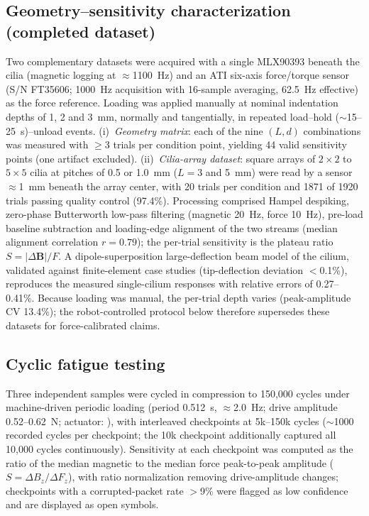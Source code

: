 \subsection*{Geometry--sensitivity characterization (completed dataset)}
Two complementary datasets were acquired with a single MLX90393 beneath the
cilia (magnetic logging at $\approx$1100~Hz) and an ATI six-axis force/torque
sensor (S/N FT35606; 1000~Hz acquisition with 16-sample averaging, 62.5~Hz
effective) as the force reference. Loading was applied manually at nominal
indentation depths of 1, 2 and 3~mm, normally and tangentially, in repeated
load--hold ($\sim$15--25~s)--unload events. (i)~\emph{Geometry matrix}: each
of the nine $(L,d)$ combinations was measured with $\geq$3 trials per
condition point, yielding 44 valid sensitivity points (one artifact
excluded). (ii)~\emph{Cilia-array dataset}: square arrays of $2\times2$ to
$5\times5$ cilia at pitches of 0.5 or 1.0~mm ($L=3$ and 5~mm) were read by a
sensor $\approx$1~mm beneath the array center, with 20 trials per condition
and 1871 of 1920 trials passing quality control (97.4\%). Processing
comprised Hampel despiking, zero-phase Butterworth low-pass filtering
(magnetic 20~Hz, force 10~Hz), pre-load baseline subtraction and
loading-edge alignment of the two streams (median alignment correlation
$r=0.79$); the per-trial sensitivity is the plateau ratio
$S=|\Delta\mathbf{B}|/F$. A dipole-superposition large-deflection beam model
of the cilium, validated against finite-element case studies (tip-deflection
deviation $<$0.1\%), reproduces the measured single-cilium responses with
relative errors of 0.27--0.41\%. Because loading was manual, the per-trial
depth varies (peak-amplitude CV 13.4\%); the robot-controlled protocol below
therefore supersedes these datasets for force-calibrated claims.

\subsection*{Cyclic fatigue testing}
Three independent samples were cycled in compression to 150{,}000 cycles
under machine-driven periodic loading (period 0.512~s, $\approx$2.0~Hz;
drive amplitude 0.52--0.62~N; actuator: ), with
interleaved checkpoints at 5k--150k cycles ($\sim$1000 recorded cycles per
checkpoint; the 10k checkpoint additionally captured all 10{,}000 cycles
continuously). Sensitivity at each checkpoint was computed as the ratio of
the median magnetic to the median force peak-to-peak amplitude
($S=\Delta B_z/\Delta F_z$), with ratio normalization removing
drive-amplitude changes; checkpoints with a corrupted-packet rate $>$9\%
were flagged as low confidence and are displayed as open symbols.


